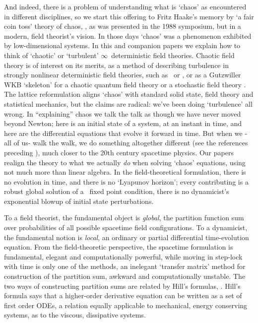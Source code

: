 And indeed, there is a problem of understanding what is `chaos' as
encountered in different disciplines, so we start this offering to Fritz
Haake's memory by {`a fair coin toss'} theory of chaos,
, as was presented in the 1988 symposium, but in a
modern, field theorist's vision. In those days `chaos' was a phenomenon
exhibited by low-dimensional systems. In this and companion papers%
 we explain how to think of `chaotic' or
`turbulent' $\infty$\dmn\ deterministic field theories.
Chaotic field theory is of interest on its merits, as a method of
describing turbulence in strongly nonlinear deterministic field theories,
such as \NS\ or \KS{}, or as a Gutzwiller WKB
`skeleton' for a chaotic quantum field theory
or a stochastic field theory%
.
The
lattice reformulation aligns `chaos' with standard solid state, field theory
and statistical mechanics, but the claims
are radical: we've been doing `turbulence' all wrong.
In ``explaining'' chaos we talk the talk
as though we have never moved beyond Newton; here is an initial state of
a system, at an instant in time, and here are the differential equations
that evolve it forward in time. But when we -all of us- walk the
walk, we do something altogether different
(see the references preceding ), much closer to the 20th
century spacetime physics. Our papers realign the theory to what we
actually {\em do} when solving `chaos' equations, using not much more
than linear algebra.
In the field-theoretical formulation, there is no evolution in time, and
there is no `Lyapunov horizon'; every contributing {\em \lattstate} is a
robust global solution of a \spt\ fixed point condition, there is no
dynamicist's exponential blowup of initial state perturbations.

To a field theorist, the fundamental object is \emph{global}, the
partition function sum over probabilities of all possible spacetime field
configurations.
To a dynamicist, the fundamental notion is \emph{local}, an ordinary or
partial differential time-evolution equation. From the field-theoretic
perspective, the spacetime formulation is fundamental, elegant and
computationally powerful, while moving in step-lock with time is only one
of the methods, an inelegant `transfer matrix' method for construction of
the partition sum, awkward and computationally unstable. The two ways of
constructing partition sums are related by Hill's formulas,
.
{Hill's formula} says that a higher-order derivative equation can be
written as a set of first order ODEs, a relation equally applicable to
mechanical, energy conserving systems, as to the viscous, dissipative
systems.

